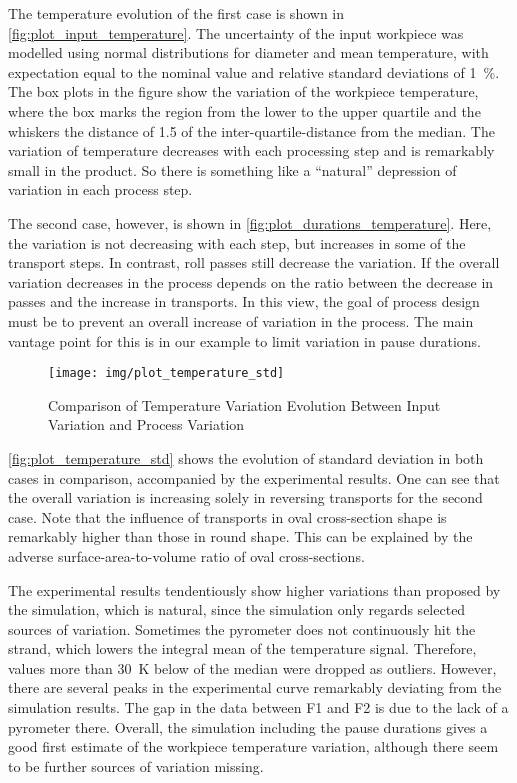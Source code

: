 The temperature evolution of the first case is shown in \autoref{fig:plot_input_temperature}.
The uncertainty of the input workpiece was modelled using normal distributions for diameter and mean temperature, with expectation equal to the nominal value and relative standard deviations of \qty{1}{\percent}.
The box plots in the figure show the variation of the workpiece temperature, where the box marks the region from the lower to the upper quartile and the whiskers the distance of \num{1.5} of the inter-quartile-distance from the median.
The variation of temperature decreases with each processing step and is remarkably small in the product.
So there is something like a ``natural'' depression of variation in each process step.

The second case, however, is shown in \autoref{fig:plot_durations_temperature}.
Here, the variation is not decreasing with each step, but increases in some of the transport steps.
In contrast, roll passes still decrease the variation.
If the overall variation decreases in the process depends on the ratio between the decrease in passes and the increase in transports.
In this view, the goal of process design must be to prevent an overall increase of variation in the process.
The main vantage point for this is in our example to limit variation in pause durations.

\begin{figure}
    \centering
    \texttt{[image: img/plot\_temperature\_std]}
    \caption{Comparison of Temperature Variation Evolution Between Input Variation and Process Variation}
    \label{fig:plot_temperature_std}
\end{figure}

\autoref{fig:plot_temperature_std} shows the evolution of standard deviation in both cases in comparison, accompanied by the experimental results.
One can see that the overall variation is increasing solely in reversing transports for the second case.
Note that the influence of transports in oval cross-section shape is remarkably higher than those in round shape.
This can be explained by the adverse surface-area-to-volume ratio of oval cross-sections.

The experimental results tendentiously show higher variations than proposed by the simulation, which is natural, since the simulation only regards selected sources of variation.
Sometimes the pyrometer does not continuously hit the strand, which lowers the integral mean of the temperature signal.
Therefore, values more than \qty{30}{\kelvin} below of the median were dropped as outliers.
However, there are several peaks in the experimental curve remarkably deviating from the simulation results.
The gap in the data between F1 and F2 is due to the lack of a pyrometer there.
Overall, the simulation including the pause durations gives a good first estimate of the workpiece temperature variation, although there seem to be further sources of variation missing.

